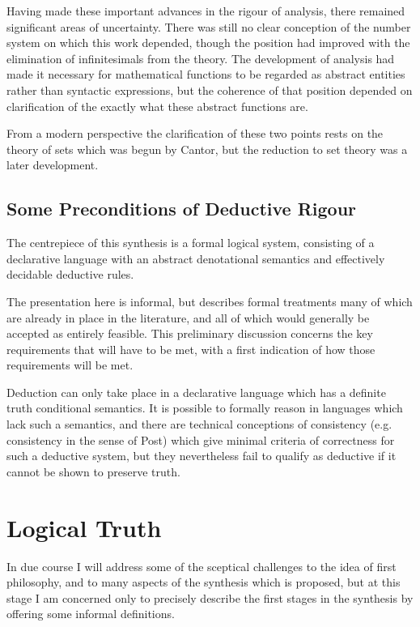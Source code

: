 \documentclass[10pt,titlepage]{book}
\begin{document}
Having made these important advances in the rigour of analysis, there remained significant areas of uncertainty.
There was still no clear conception of the number system on which this work depended, though the position had improved with the elimination of infinitesimals from the theory.
The development of analysis had made it necessary for mathematical functions to be regarded as abstract entities rather than syntactic expressions, but the coherence of that position depended on clarification of the exactly what these abstract functions are.

From a modern perspective the clarification of these two points rests on the theory of sets which was begun by Cantor, but the reduction to set theory was a later development.

\section{Some Preconditions of Deductive Rigour}

The centrepiece of this synthesis is a formal logical system, consisting of a declarative language with an abstract denotational semantics and effectively decidable deductive rules.

The presentation here is informal, but describes formal treatments many of which are already in place in the literature, and all of which would generally be accepted as entirely feasible.
This preliminary discussion concerns the key requirements that will have to be met, with a first indication of how those requirements will be met.

Deduction can only take place in a declarative language which has a definite truth conditional semantics.
It is possible to formally reason in languages which lack such a semantics, and there are technical conceptions of consistency (e.g. consistency in the sense of Post) which give minimal criteria of correctness for such a deductive system, but they nevertheless fail to qualify as deductive if it cannot be shown to preserve truth.

\chapter{Logical Truth}

In due course I will address some of the sceptical challenges to the idea of first philosophy, and to many aspects of the synthesis which is proposed, but at this stage I am concerned only to precisely describe the first stages in the synthesis by offering some informal definitions.
\end{document}
